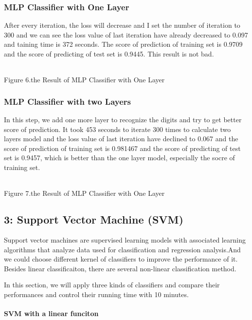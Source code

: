 \documentclass[11pt]{article}
\begin{document}
\subsubsection{MLP Classifier with One
Layer}\label{mlp-classifier-with-one-layer}

After every iteration, the loss will decrease and I set the number of
iteration to 300 and we can see the loss value of last iteration have
already decreased to 0.097 and taining time is 372 seconds. The score of
prediction of training set is 0.9709 and the score of predicting of test
set is 0.9445. This result is not bad.

\\
Figure 6.the Result of MLP Classifier with One Layer

\subsubsection{MLP Classifier with two
Layers}\label{mlp-classifier-with-two-layers}

In this step, we add one more layer to recognize the digits and try to
get better score of prediction. It took 453 seconds to iterate 300 times
to calculate two layers model and the loss value of last iteration have
declined to 0.067 and the score of prediction of training set is
0.981467 and the score of predicting of test set is 0.9457, which is
better than the one layer model, especially the socre of training set.

\\
Figure 7.the Result of MLP Classifier with One Layer

\subsection{\texorpdfstring{\textbf{3: Support Vector Machine
(SVM)}}{3: Support Vector Machine (SVM)}}\label{support-vector-machine-svm}

Support vector machines are supervised learning models with associated
learning algorithms that analyze data used for classification and
regression analysis.And we could choose different kernel of classifiers
to improve the performance of it. Besides linear classificaiton, there
are several non-linear classification method.

In this section, we will apply three kinds of classifiers and compare
their performances and control their running time with 10 minutes.

\paragraph{SVM with a linear funciton}\label{svm-with-a-linear-funciton}
\end{document}
